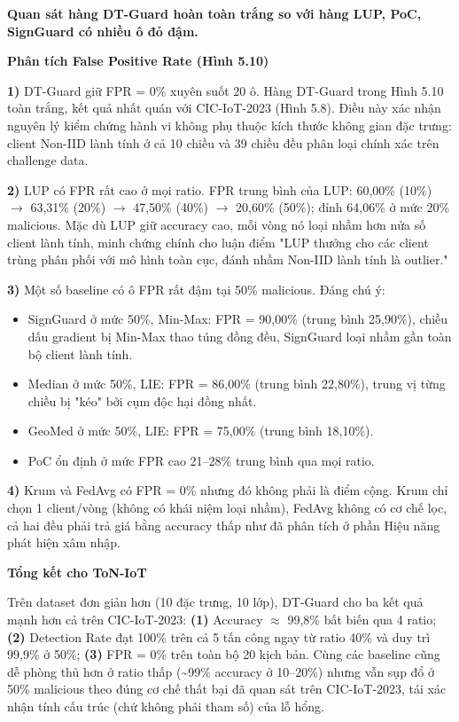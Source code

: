 \textbf{Quan sát hàng DT-Guard hoàn toàn trắng so với hàng LUP, PoC, SignGuard có nhiều ô đỏ đậm.}

\textbf{Phân tích False Positive Rate (Hình 5.10)}

\textbf{1)} DT-Guard giữ FPR = 0\% xuyên suốt 20 ô. Hàng DT-Guard trong Hình 5.10 toàn trắng, kết quả nhất quán với CIC-IoT-2023 (Hình 5.8). Điều này xác nhận nguyên lý kiểm chứng hành vi không phụ thuộc kích thước không gian đặc trưng: client Non-IID lành tính ở cả 10 chiều và 39 chiều đều phân loại chính xác trên challenge data.

\textbf{2)} LUP có FPR rất cao ở mọi ratio. FPR trung bình của LUP: 60,00\% (10\%) $\rightarrow$ 63,31\% (20\%) $\rightarrow$ 47,50\% (40\%) $\rightarrow$ 20,60\% (50\%); đỉnh 64,06\% ở mức 20\% malicious. Mặc dù LUP giữ accuracy cao, mỗi vòng nó loại nhầm hơn nửa số client lành tính, minh chứng chính cho luận điểm "LUP thưởng cho các client trùng phân phối với mô hình toàn cục, đánh nhầm Non-IID lành tính là outlier."

\textbf{3)} Một số baseline có ô FPR rất đậm tại 50\% malicious. Đáng chú ý:

\begin{itemize}
\item
  SignGuard ở mức 50\%, Min-Max: FPR = 90,00\% (trung bình 25,90\%), chiều dấu gradient bị Min-Max thao túng đồng đều, SignGuard loại nhầm gần toàn bộ client lành tính.
\item
  Median ở mức 50\%, LIE: FPR = 86,00\% (trung bình 22,80\%), trung vị từng chiều bị "kéo" bởi cụm độc hại đồng nhất.
\item
  GeoMed ở mức 50\%, LIE: FPR = 75,00\% (trung bình 18,10\%).
\item
  PoC ổn định ở mức FPR cao 21--28\% trung bình qua mọi ratio.
\end{itemize}

\textbf{4)} Krum và FedAvg có FPR = 0\% nhưng đó không phải là điểm cộng. Krum chỉ chọn 1 client/vòng (không có khái niệm loại nhầm), FedAvg không có cơ chế lọc, cả hai đều phải trả giá bằng accuracy thấp như đã phân tích ở phần Hiệu năng phát hiện xâm nhập.

\textbf{Tổng kết cho ToN-IoT}

Trên dataset đơn giản hơn (10 đặc trưng, 10 lớp), DT-Guard cho ba kết quả mạnh hơn cả trên CIC-IoT-2023: \textbf{(1)} Accuracy $\approx$ 99,8\% bất biến qua 4 ratio; \textbf{(2)} Detection Rate đạt 100\% trên cả 5 tấn công ngay từ ratio 40\% và duy trì 99,9\% ở 50\%; \textbf{(3)} FPR = 0\% trên toàn bộ 20 kịch bản. Cùng các baseline cũng dễ phòng thủ hơn ở ratio thấp (\textasciitilde99\% accuracy ở 10--20\%) nhưng vẫn sụp đổ ở 50\% malicious theo đúng cơ chế thất bại đã quan sát trên CIC-IoT-2023, tái xác nhận tính cấu trúc (chứ không phải tham số) của lỗ hổng.

